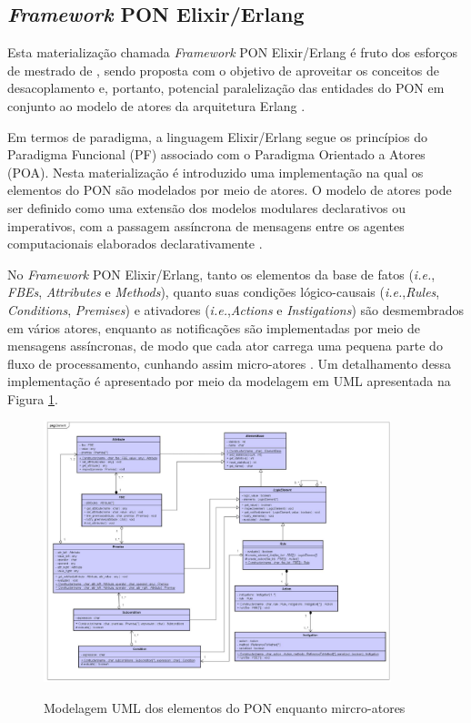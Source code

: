 \subsection{\textit{Framework} PON Elixir/Erlang}

Esta materialização chamada \textit{Framework} PON Elixir/Erlang é fruto dos
esforços de mestrado de , sendo proposta com o
objetivo de aproveitar os conceitos de desacoplamento e, portanto, potencial
paralelização das entidades do PON em conjunto ao modelo de atores da
arquitetura Erlang \cite{msc_negrini_2019}.

Em termos de paradigma, a linguagem Elixir/Erlang segue os princípios do
Paradigma Funcional (PF) associado com o Paradigma Orientado a Atores (POA).
Nesta materialização é introduzido uma implementação na qual os elementos do PON
são modelados por meio de atores. O modelo de atores pode ser definido como uma
extensão dos modelos modulares declarativos ou imperativos, com a passagem
assíncrona de mensagens entre os agentes computacionais elaborados
declarativamente \cite{msc_negrini_2019}.

No \textit{Framework} PON Elixir/Erlang, tanto os elementos da base de fatos
(\textit{i.e.}, \textit{FBEs}, \textit{Attributes} e \textit{Methods}), quanto
suas condições lógico-causais (\textit{i.e.},\textit{Rules},
\textit{Conditions}, \textit{Premises}) e ativadores
(\textit{i.e.},\textit{Actions} e \textit{Instigations}) são desmembrados em
vários atores, enquanto as notificações são implementadas por meio de mensagens
assíncronas, de modo que cada ator carrega uma pequena parte do fluxo de
processamento, cunhando assim micro-atores \cite{msc_negrini_2019}. Um
detalhamento dessa implementação é apresentado por meio da modelagem em UML
apresentada na Figura \ref{fig:pon_elixir_uml}.

\begin{figure}[!htb]
  \centering
  \caption{Modelagem UML dos elementos do PON enquanto mircro-atores}
  \includegraphics[width=0.9\textwidth]{../figures/pon_elixir_uml.png}
  \smallskip
  \label{fig:pon_elixir_uml}
\end{figure}
\FloatBarrier

